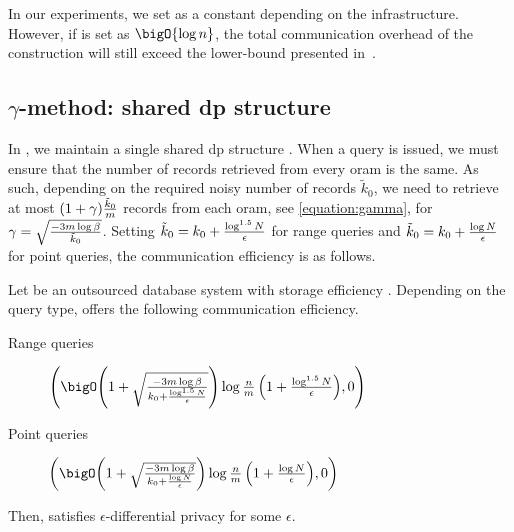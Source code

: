		In our experiments, we set \oramsNumber{} as a constant depending on the infrastructure.
		However, if \oramsNumber{} is set as $\bigO{\log n}$, the total communication overhead of the construction will still exceed the lower-bound presented in~\cite{multi-server-orams}.

	\subsection{\texorpdfstring{$\gamma$-method}{Gamma-method}: shared \acrshort{dp} structure}\label{section:range-persistent:prallel-dp-oram:gamma}

		In \protocolGamma{}, we maintain a single shared \acrshort{dp} structure \serverDS{}.
		When a query is issued, we must ensure that the number of records retrieved from every \acrshort{oram} is the same.
		As such, depending on the required noisy number of records $\tilde{k}_0$, we need to retrieve at most $( 1 + \gamma ) \frac{ \tilde{k}_0 }{m}$ records from each \acrshort{oram}, see \cref{equation:gamma}, for $\gamma = \sqrt{ \frac{-3 m \log \beta}{ \tilde{k}_0 } }$.
		Setting $\tilde{k}_0 = k_0 + \frac{\log^{1.5} N}{\epsilon}$ for range queries and $\tilde{k}_0 = k_0 + \frac{\log N}{\epsilon}$ for point queries, the communication efficiency is as follows.

		\begin{corollary}\label{corollary:gamma}
			Let \protocolGamma{} be an outsourced database system with storage efficiency .
			Depending on the query type, \protocolGamma{} offers the following communication efficiency.
			\begin{description}
				\item[Range queries] $\efficiency{ \left( 1 + \sqrt{ \frac{-3 \oramsNumber \log \beta}{k_0 + \frac{ \log^{1.5} \domainSize }{ \epsilon }} }\right) \log \frac{\dataSize}{\oramsNumber} \left( 1 + \frac{\log^{1.5} \domainSize}{\epsilon} \right) }{0}$
				\item[Point queries] $\efficiency{ \left( 1 + \sqrt{ \frac{-3 \oramsNumber \log \beta}{k_0 + \frac{ \log \domainSize }{ \epsilon }} }\right) \log \frac{\dataSize}{\oramsNumber} \left( 1 + \frac{\log \domainSize}{\epsilon} \right) }{0}$
			\end{description}
			Then, \protocolGamma{} satisfies $\epsilon$-differential privacy for some $\epsilon$.
		\end{corollary}

